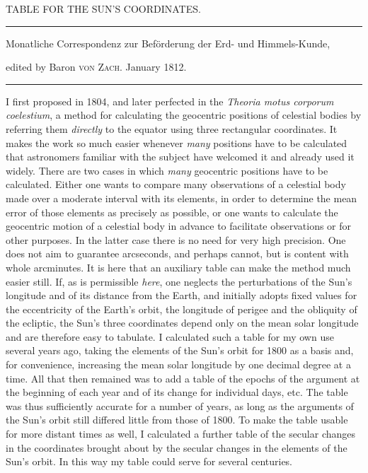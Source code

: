 \clearpage{}%
\begin{center}
{\small TABLE FOR THE SUN’S COORDINATES.\par}
\medskip\hrule\medskip
{\small Monatliche Correspondenz zur Beförderung der Erd- und Himmels-Kunde,\par
edited by Baron \textsc{von Zach}. January 1812.\par}
\medskip\hrule
\end{center}\medskip
I first proposed in 1804, and later perfected in the \emph{Theoria motus corporum coelestium}, a method for calculating the geocentric positions of celestial bodies by referring them \emph{directly} to the equator using three rectangular coordinates. It makes the work so much easier whenever \emph{many} positions have to be calculated that astronomers familiar with the subject have welcomed it and already used it widely. There are two cases in which \emph{many} geocentric positions have to be calculated. Either one wants to compare many observations of a celestial body made over a moderate interval with its elements, in order to determine the mean error of those elements as precisely as possible, or one wants to calculate the geocentric motion of a celestial body in advance to facilitate observations or for other purposes. In the latter case there is no need for very high precision. One does not aim to guarantee arcseconds, and perhaps cannot, but is content with whole arcminutes. It is here that an auxiliary table can make the method much easier still. If, as is permissible \emph{here}, one neglects the perturbations of the Sun’s longitude and of its distance from the Earth, and initially adopts
%
fixed values for the eccentricity of the Earth’s orbit, the longitude of perigee and the obliquity of the ecliptic, the Sun’s three coordinates depend only on the mean solar longitude and are therefore easy to tabulate. I calculated such a table for my own use several years ago, taking the elements of the Sun’s orbit for 1800 as a basis and, for convenience, increasing the mean solar longitude by one decimal degree at a time. All that then remained was to add a table of the epochs of the argument at the beginning of each year and of its change for individual days, etc. The table was thus sufficiently accurate for a number of years, as long as the arguments of the Sun’s orbit still differed little from those of 1800. To make the table usable for more distant times as well, I calculated a further table of the secular changes in the coordinates brought about by the secular changes in the elements of the Sun’s orbit. In this way my table could serve for several centuries.

